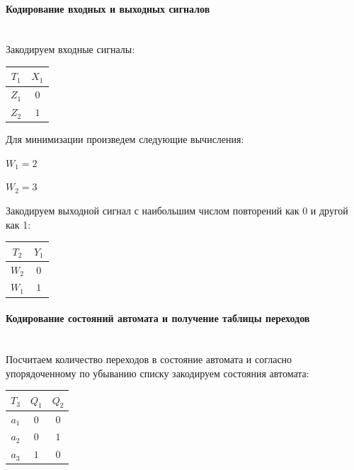 \paragraph{Кодирование входных и выходных сигналов}\mbox{}\\

Закодируем входные сигналы:

\begin{table}[!h]
\begin{tabular}{|c|c|}
\hline
$T_1$ & $X_1$ \\ \hline
$Z_1$ & $0$ \\ \hline
$Z_2$ & $1$ \\ \hline
\end{tabular}
\end{table}

Для минимизации произведем следующие вычисления:

$W_1 = 2$

$W_2 = 3$

Закодируем выходной сигнал с наибольшим числом повторений как 0 и другой как 1:

\begin{table}[!h]
\begin{tabular}{|c|c|}
\hline
$T_2$ & $Y_1$ \\ \hline
$W_2$ & $0$ \\ \hline
$W_1$ & $1$ \\ \hline
\end{tabular}
\end{table}

\paragraph{Кодирование состояний автомата и получение таблицы переходов}\mbox{}\\

Посчитаем количество переходов в состояние автомата и согласно
упорядоченному по убыванию списку закодируем состояния автомата:
\begin{table}[H]
\begin{tabular}{|c|c|c|}
\hline
$T_3$ & $Q_1$ & $Q_2$  \\ \hline
$a_1$ & $0$ & $0$  \\ \hline
$a_2$ & $0$ & $1$  \\ \hline
$a_3$ & $1$ & $0$  \\ \hline
\end{tabular}
\end{table}

